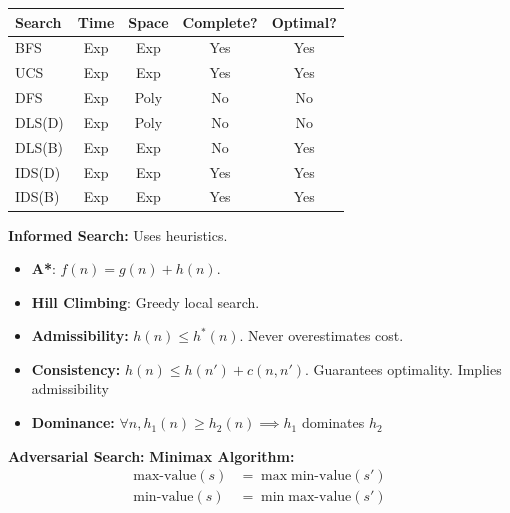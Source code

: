 \documentclass[8pt,twocolumn]{article}
\begin{document}
{}
\setlength{\extrarowheight}{0pt}
\setlength{\parskip}{0pt}
\begin{tabular}{|l|c|c|c|c|}
    \hline
    \textbf{Search} & \textbf{Time} & \textbf{Space} & \textbf{Complete?} & \textbf{Optimal?} \\
    \hline
    BFS  & Exp & Exp  & Yes  & Yes  \\
    UCS  & Exp & Exp  & Yes  & Yes  \\
    DFS  & Exp & Poly & No   & No   \\
    DLS(D)  & Exp & Poly & No   & No   \\
    DLS(B)  & Exp & Exp & No   & Yes   \\
    IDS(D)  & Exp & Exp  & Yes  & Yes  \\
    IDS(B)  & Exp & Exp  & Yes  & Yes  \\
    \hline
\end{tabular}
\newline
\textbf{Informed Search:} Uses heuristics.
\vspace{-0.6em}
\begin{itemize}
    \setlength{\itemsep}{0pt}
    \setlength{\parskip}{0pt}
    \item \textbf{A*}: $f(n) = g(n) + h(n)$.
    \item \textbf{Hill Climbing}: Greedy local search.
\end{itemize}
\vspace{-0.6em}
\vspace{-0.6em}
\begin{itemize}
    \setlength{\itemsep}{0pt}
    \setlength{\parskip}{0pt}
    \item \textbf{Admissibility:} $h(n) \leq h^*(n)$. Never overestimates cost.
    \item \textbf{Consistency:} $h(n) \leq h(n') + c(n, n')$. Guarantees optimality. Implies admissibility
    \item \textbf{Dominance:} $\forall n, h_1(n) \geq h_2(n) \implies h_1$ dominates $h_2$
\end{itemize}
\vspace{-0.6em}
\textbf{Adversarial Search:}
\textbf{Minimax Algorithm:}
\begin{align*}
    \text{max-value}(s) &= \max \text{min-value}(s') \\
    \text{min-value}(s) &= \min \text{max-value}(s')
\end{align*}
\end{document}
